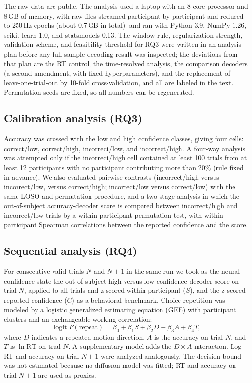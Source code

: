 \documentclass[11pt,a4paper]{article}
\begin{document}
The raw data are public. The analysis used a laptop with an 8-core processor and 8\,GB of memory, with raw files streamed participant by participant and reduced to 250\,Hz epochs (about 0.7\,GB in total), and ran with Python 3.9, NumPy 1.26, scikit-learn 1.0, and statsmodels 0.13. The window rule, regularization strength, validation scheme, and feasibility threshold for RQ3 were written in an analysis plan before any full-sample decoding result was inspected; the deviations from that plan are the RT control, the time-resolved analysis, the comparison decoders (a second amendment, with fixed hyperparameters), and the replacement of leave-one-trial-out by 10-fold cross-validation, and all are labeled in the text. Permutation seeds are fixed, so all numbers can be regenerated.

\subsection{Calibration analysis (RQ3)}

Accuracy was crossed with the low and high confidence classes, giving four cells: correct/low, correct/high, incorrect/low, and incorrect/high. A four-way analysis was attempted only if the incorrect/high cell contained at least 100 trials from at least 12 participants with no participant contributing more than 20\% (rule fixed in advance). We also evaluated pairwise contrasts (incorrect/high versus incorrect/low, versus correct/high; incorrect/low versus correct/low) with the same LOSO and permutation procedure, and a two-stage analysis in which the out-of-subject accuracy-decoder score is compared between incorrect/high and incorrect/low trials by a within-participant permutation test, with within-participant Spearman correlations between the reported confidence and the score.

\subsection{Sequential analysis (RQ4)}

For consecutive valid trials $N$ and $N{+}1$ in the same run we took as the neural confidence state the out-of-subject high-versus-low-confidence decoder score on trial $N$, applied to all trials and z-scored within participant ($S$), and the z-scored reported confidence ($C$) as a behavioral benchmark. Choice repetition was modeled by a logistic generalized estimating equation (GEE) \cite{r27} with participant clusters and an exchangeable working correlation:
\begin{equation}
\operatorname{logit}P(\mathrm{repeat})=\beta_0+\beta_1 S+\beta_2 D+\beta_3 A+\beta_4 T,
\label{eq:gee}
\end{equation}
where $D$ indicates a repeated motion direction, $A$ is the accuracy on trial $N$, and $T$ is $\ln\mathrm{RT}$ on trial $N$. A supplementary model adds the $D\times A$ interaction. Log RT and accuracy on trial $N{+}1$ were analyzed analogously. The decision bound was not estimated because no diffusion model was fitted; RT and accuracy on trial $N{+}1$ are used as proxies.
\end{document}
